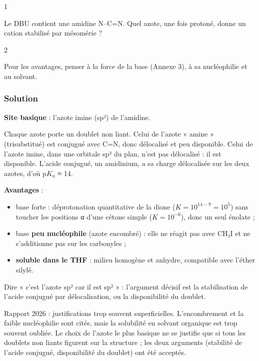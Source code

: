 \documentclass[11pt,a4paper]{article}
\providecommand{\tightlist}{\setlength{\itemsep}{0pt}\setlength{\parskip}{0pt}}
\begin{document}
\begin{indication}{1}

Le DBU contient une amidine N--C=N. Quel azote, une fois protoné, donne un cation stabilisé par mésomérie ?

\end{indication}

\begin{indication}{2}

Pour les avantages, penser à la force de la base (Annexe 3), à sa nucléophilie et au solvant.

\end{indication}

\hypertarget{solution-10}{%
\subsubsection{Solution}\label{solution-10}}

\textbf{Site basique} : l'azote imine (sp²) de l'amidine.

Chaque azote porte un doublet non liant. Celui de l'azote « amine » (trisubstitué) est conjugué avec C=N, donc délocalisé et peu disponible. Celui de l'azote imine, dans une orbitale sp² du plan, n'est pas délocalisé : il est disponible. L'acide conjugué, un amidinium, a sa charge délocalisée sur les deux azotes, d'où p\(K_a\) ≈ 14.

\textbf{Avantages} :

\begin{itemize}
\tightlist
\item
  base forte : déprotonation quantitative de la dione (\(K=10^{14-9}=10^5\)) sans toucher les positions α d'une cétone simple (\(K=10^{-6}\)), donc un seul énolate ;
\item
  base \textbf{peu nucléophile} (azote encombré) : elle ne réagit pas avec CH₃I et ne s'additionne pas sur les carbonyles ;
\item
  \textbf{soluble dans le THF} : milieu homogène et anhydre, compatible avec l'éther silylé.
\end{itemize}

\begin{piege}

Dire « c'est l'azote sp² car il est sp² » : l'argument décisif est la stabilisation de l'acide conjugué par délocalisation, ou la disponibilité du doublet.

\end{piege}

\begin{jury}

Rapport 2026 : justifications trop souvent superficielles. L'encombrement et la faible nucléophilie sont cités, mais la solubilité en solvant organique est trop souvent oubliée. Le choix de l'azote le plus basique ne se justifie que si tous les doublets non liants figurent sur la structure ; les deux arguments (stabilité de l'acide conjugué, disponibilité du doublet) ont été acceptés.

\end{jury}
\end{document}
